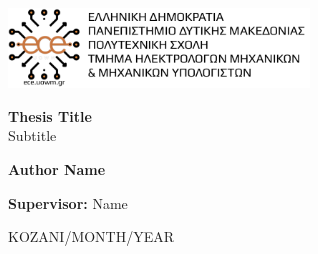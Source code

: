 \begin{titlepage}


\includegraphics[width=0.6\textwidth]{images/logo}


  \begin{center}
        \vspace*{3cm}
            
        \Huge
        \color{orange}
        \textbf{Thesis Title}\\
         \color{black} 
        \vspace{0.5cm}
        \LARGE
        Subtitle\\
        \vspace{0.5cm}
        
            
        \vspace{1.5cm}
        \LARGE    
        \textbf{Author Name}
            
         \vspace{3.5cm}
        \textbf{Supervisor:} Name
        \vfill    
        \vspace{0.8cm}
            
       
            
        \Large
       KOZANI/MONTH/YEAR
       \end{center}
\end{titlepage}